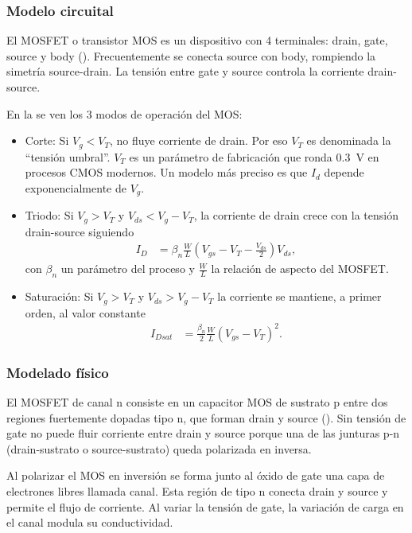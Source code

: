 \subsubsection{Modelo circuital}
El MOSFET o transistor MOS es un dispositivo con 4 terminales:
drain, gate, source y body ().
Frecuentemente se conecta source con body, rompiendo la simetría source-drain.
La tensión entre gate y source controla la corriente drain-source.

En la  se ven los 3 modos de operación del MOS:
\begin{itemize}
    \item Corte: Si $V_g<V_T$, no fluye corriente de drain.
        Por eso $V_T$ es denominada la ``tensión umbral''.
        $V_T$ es un parámetro de fabricación que ronda \SI{.3}{\volt} en procesos CMOS
        modernos.
        Un modelo más preciso es que $I_d$ depende exponencialmente de $V_g$.
    \item Triodo: Si $V_g>V_T$ y $V_{ds}<V_g-V_T$, la corriente de drain crece con la
        tensión drain-source siguiendo
        \begin{align*}
            I_D&=\beta_n\frac WL(V_{gs}-V_T-\frac{V_{ds}}2)V_{ds},
        \end{align*}
        con $\beta_n$ un parámetro del proceso y $\frac WL$ la relación de
        aspecto del MOSFET.
    \item Saturación: Si $V_g>V_T$ y $V_{ds}>V_g-V_T$ la corriente se mantiene, a primer
        orden, al valor constante
        \begin{align*}
            I_{Dsat}&=\frac{\beta_n}2\frac WL(V_{gs}-V_T)^2.
        \end{align*}
\end{itemize}
%
\subsubsection{Modelado físico}
El MOSFET de canal n consiste en un capacitor MOS de sustrato p entre dos regiones fuertemente dopadas 
tipo n, 
que forman drain y source ().
Sin tensión de gate no puede fluir corriente entre drain y source porque una de las
junturas p-n (drain-sustrato o source-sustrato) queda polarizada en inversa.

Al polarizar el MOS en inversión se forma junto al óxido de gate 
una capa de electrones libres llamada canal.
Esta región de tipo n conecta drain y source y permite el flujo de corriente.
Al variar la tensión de gate, la variación de carga en el canal modula su
conductividad.
